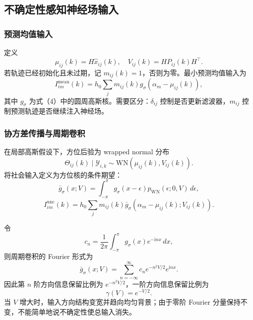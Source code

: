 \documentclass[UTF8,fontset=windows,11pt]{ctexart}
\begin{document}
\subsection{不确定性感知神经场输入}

\subsubsection{预测均值输入}
定义
\begin{equation}
 \mu_{ij}(k)=H\hat x_{ij}(k),\quad V_{ij}(k)=HP_{ij}(k)H^\top.
\end{equation}
若轨迹已经初始化且未过期，记 $m_{ij}(k)=1$，否则为零。最小预测均值输入为
\begin{equation}
 I^{\mathrm{mean}}_{im}(k)=h_0\sum_jm_{ij}(k)
 g_\sigma(\alpha_m-\mu_{ij}(k)),
\end{equation}
其中 $g_\sigma$ 为式（4）中的圆周高斯核。需要区分：$\delta_{ij}$ 控制是否更新滤波器，$m_{ij}$ 控制预测轨迹是否继续注入神经场。

\subsubsection{协方差传播与周期卷积}
在局部高斯假设下，方位后验为 wrapped normal 分布
\begin{equation}
 \Theta_{ij}(k)\mid\mathcal Y_{i,k}\sim\mathrm{WN}(\mu_{ij}(k),V_{ij}(k)).
\end{equation}
将社会输入定义为方位核的条件期望：
\begin{equation}
 \bar g_\sigma(x;V)=\int_{-\pi}^{\pi}g_\sigma(x-\epsilon)p_{\mathrm{WN}}(\epsilon;0,V)\,d\epsilon,
\end{equation}
\begin{equation}
 I^{\mathrm{unc}}_{im}(k)=h_0\sum_jm_{ij}(k)\bar g_\sigma(\alpha_m-\mu_{ij}(k);V_{ij}(k)).
\end{equation}

令
\begin{equation}
 c_n=\frac{1}{2\pi}\int_{-\pi}^{\pi}g_\sigma(x)e^{-\mathrm inx}\,dx,
\end{equation}
则周期卷积的 Fourier 形式为
\begin{equation}
 \bar g_\sigma(x;V)=\sum_{n=-\infty}^{\infty}c_n e^{-n^2V/2}e^{\mathrm inx}.
\end{equation}
因此第 $n$ 阶方向信息保留比例为 $e^{-n^2V/2}$，一阶方向信息保留比例为
\begin{equation}
 \gamma(V)=e^{-V/2}.
\end{equation}
当 $V$ 增大时，输入方向结构变宽并趋向均匀背景；由于零阶 Fourier 分量保持不变，不能简单地说不确定性使总输入消失。
\end{document}
